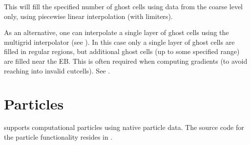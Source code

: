\documentclass[letterpaper,10pt,english]{sphinxmanual}
\begin{document}
\begin{sphinxVerbatim}[commandchars=\\\{\},formatcom=\scriptsize]
       
      

       
         
\end{sphinxVerbatim}

This will fill the specified number of ghost cells using data from the coarse level only, using piecewise linear interpolation (with limiters).

As an alternative, one can interpolate a single layer of ghost cells using the multigrid interpolator (see {\hyperref[\detokenize{Source/LinearSolvers:chap-multigridinterpolation}]{}}).
In this case only a single layer of ghost cells are filled in regular regions, but additional ghost cells (up to some specified range) are filled near the EB.
This is often required when computing gradients (to avoid reaching into invalid cut\sphinxhyphen{}cells).
See {\hyperref[\detokenize{Source/MeshData:chap-gradients}]{}}.


\section{Particles}
\label{\detokenize{Source/Particles:particles}}\label{\detokenize{Source/Particles:chap-particles}}\label{\detokenize{Source/Particles::doc}}
 supports computational particles using native  particle data.
The source code for the particle functionality resides in .
\end{document}
